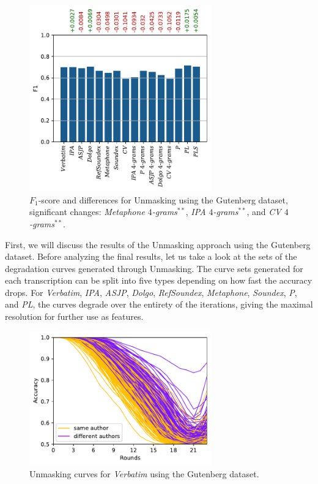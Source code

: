 \begin{figure}
  \centering
  \includegraphics[width=0.7\textwidth]{figures/results_f1_gb_unmasking}
  \caption{$F_1$-score and differences for Unmasking using the Gutenberg dataset, significant changes: \textit{Metaphone $4$-grams}$^{\ast\ast}$, \textit{IPA $4$-grams}$^{\ast\ast}$, and \textit{CV $4$-grams}$^{\ast\ast}$.}
  \label{fig:results_f1_gb_unmasking}
\end{figure}
First, we will discuss the results of the Unmasking approach using the Gutenberg dataset.
Before analyzing the final results, let us take a look at the sets of the degradation curves generated through Unmasking.
The curve sets generated for each transcription can be split into five types depending on how fast the accuracy drops.
For \textit{Verbatim}, \textit{IPA}, \textit{ASJP}, \textit{Dolgo}, \textit{RefSoundex}, \textit{Metaphone}, \textit{Soundex}, \textit{P}, and \textit{PL}, the curves degrade over the entirety of the iterations, giving the maximal resolution for further use as features.
\begin{figure}
  \centering
  \includegraphics[width=0.7\textwidth]{figures/verbatim_curves}
  \caption{Unmasking curves for \textit{Verbatim} using the Gutenberg dataset.}
  \label{fig:verbatim_curves}
\end{figure}
